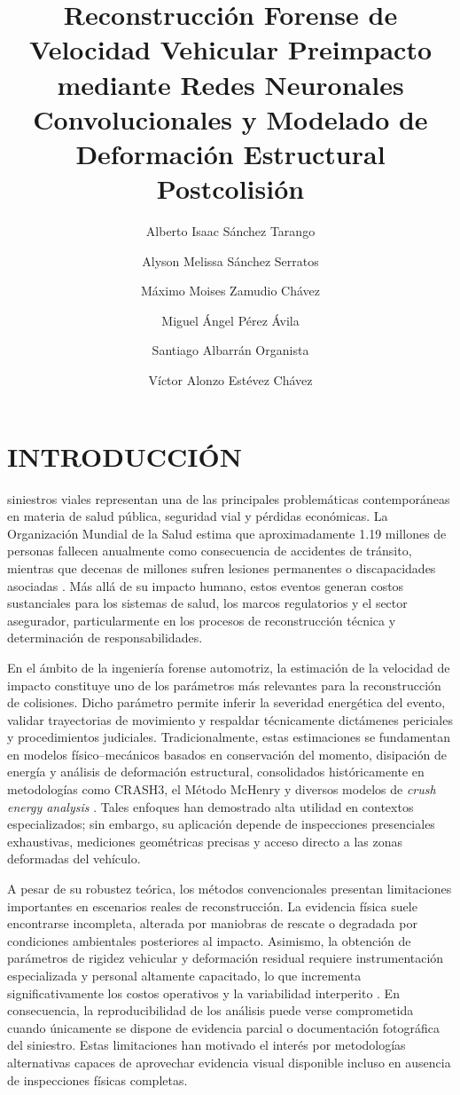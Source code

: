 \documentclass[esp]{cesvi-class}
\title{Reconstrucción Forense de Velocidad Vehicular Preimpacto mediante Redes Neuronales Convolucionales y Modelado de Deformación Estructural Postcolisión}
\author[1]{Alberto Isaac Sánchez Tarango}
\author[1]{Alyson Melissa Sánchez Serratos}
\author[1]{Máximo Moises Zamudio Chávez}
\author[1]{Miguel Ángel Pérez Ávila}
\author[1]{Santiago Albarrán Organista}
\author[1]{Víctor Alonzo Estévez Chávez}
\affil[1]{Tecnológico de Monterrey, Escuela de Ingeniería y Ciencias, Campus Toluca, Estado de México, México}
\begin{document}
\maketitle
\thispagestyle{fancy}
\printcontactdata

\section{INTRODUCCIÓN}

 siniestros viales representan una de las principales problemáticas contemporáneas en materia de salud pública, seguridad vial y pérdidas económicas. La Organización Mundial de la Salud estima que aproximadamente 1.19 millones de personas fallecen anualmente como consecuencia de accidentes de tránsito, mientras que decenas de millones sufren lesiones permanentes o discapacidades asociadas \cite{WHO_RoadTrafficInjuries}. Más allá de su impacto humano, estos eventos generan costos sustanciales para los sistemas de salud, los marcos regulatorios y el sector asegurador, particularmente en los procesos de reconstrucción técnica y determinación de responsabilidades.

En el ámbito de la ingeniería forense automotriz, la estimación de la velocidad de impacto constituye uno de los parámetros más relevantes para la reconstrucción de colisiones. Dicho parámetro permite inferir la severidad energética del evento, validar trayectorias de movimiento y respaldar técnicamente dictámenes periciales y procedimientos judiciales. Tradicionalmente, estas estimaciones se fundamentan en modelos físico--mecánicos basados en conservación del momento, disipación de energía y análisis de deformación estructural, consolidados históricamente en metodologías como CRASH3, el Método McHenry y diversos modelos de \textit{crush energy analysis} \cite{FrickeTrafficCrashReconstruction,BrachBrach2011,DailyShigemura2020}. Tales enfoques han demostrado alta utilidad en contextos especializados; sin embargo, su aplicación depende de inspecciones presenciales exhaustivas, mediciones geométricas precisas y acceso directo a las zonas deformadas del vehículo.

A pesar de su robustez teórica, los métodos convencionales presentan limitaciones importantes en escenarios reales de reconstrucción. La evidencia física suele encontrarse incompleta, alterada por maniobras de rescate o degradada por condiciones ambientales posteriores al impacto. Asimismo, la obtención de parámetros de rigidez vehicular y deformación residual requiere instrumentación especializada y personal altamente capacitado, lo que incrementa significativamente los costos operativos y la variabilidad interperito \cite{DailyShigemura2020}. En consecuencia, la reproducibilidad de los análisis puede verse comprometida cuando únicamente se dispone de evidencia parcial o documentación fotográfica del siniestro. Estas limitaciones han motivado el interés por metodologías alternativas capaces de aprovechar evidencia visual disponible incluso en ausencia de inspecciones físicas completas.
\end{document}

